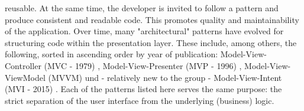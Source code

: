 reusable. At the same time, the developer is invited to follow a pattern and produce consistent and readable code. This promotes quality and
maintainability of the application. Over time, many "architectural" patterns have evolved for structuring code within the presentation layer. 
These include, among others, the following, sorted in ascending order by year of publication: Model-View-Controller (MVC - 1979) 
\cite{theModelViewEditorTrygveReenskaug1979,modelsViewsControllersTrygveReenskaug1979,aDescriptionOfTheModelViewControllerGlennE1988,professionalASPNETMVC52014}, 
Model-View-Presenter (MVP - 1996) 
\cite{mVPModelViewPresenterTheTaligentMikePotel1996,modelViewPresenterMartinFowler2006,proAspNetMVC3FrameworkModelViewPresenter2011},
Model-View-ViewModel (MVVM) 
\cite{introductionToModelViewModelPatternJohnGossman2005, modelViewViewModelDesignPatternUsingWindowsErikSorenson2010,proAspNetMVC3FrameworkModelViewPresenter2011}
und - relatively new to the group - Model-View-Intent (MVI - 2015) 
\cite{whatIfTheUserWasAFunctionYoutubeAndreStaltzUserFunction2015,reactiveProgrammingWithRxJSMVISergiMansilla,modelViewIntentOnAndroidHannesDorfmann2016}. 
Each of the patterns listed here serves the same purpose: the strict separation of the user interface from the underlying (business) logic.
\\
\\




























